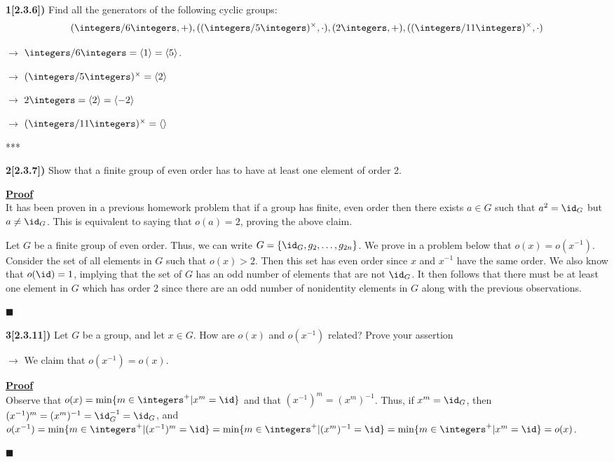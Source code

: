 \documentclass[12pt,a4paper]{article}
\newcommand{\prob}[2]{\textbf{#1)} #2}
\newenvironment{proof}
{
\textbf{\underline{Proof}} \\
}
{
\begin{flushright}
$\blacksquare$
\end{flushright}}
\begin{document}
\prob{1[2.3.6]}{Find all the generators of the following cyclic groups: 
\begin{align*}
(\integers/6\integers,+),((\integers/5\integers)^{\times},\cdot),(2\integers,+),((\integers/11\integers)^{\times},\cdot)
\end{align*}
}
$\rightarrow$ $\integers/6\integers = \langle 1 \rangle = \langle 5 \rangle$.

$\rightarrow$ $(\integers/5\integers)^{\times} = \langle 2 \rangle$

$\rightarrow$ $2\integers = \langle 2 \rangle = \langle -2 \rangle$

$\rightarrow$ $(\integers/11\integers)^{\times} = \langle \rangle$

***

\prob{2[2.3.7]}{Show that a finite group of even order has to have at least one element of order 2.}

\begin{proof}
It has been proven in a previous homework problem that if a group has finite, even order then there exists $a \in G$ such that $a^2 = \id_G$ but $a \not= \id_G$. This is equivalent to saying that $o(a) = 2$, proving the above claim.

Let $G$ be a finite group of even order. Thus, we can write $G = \{\id_{G},g_2,\hdots,g_{2n}\}$. We prove in a problem below that $o(x) = o(x^{-1})$. Consider the set of all elements in $G$ such that $o(x) > 2$. Then this set has even order since $x$ and $x^{-1}$ have the same order. We also know that $o(\id) = 1$, implying that the set of $G$ has an odd number of elements that are not $\id_G$. It then follows that there must be at least one element in $G$ which has order 2 since there are an odd number of nonidentity elements in $G$ along with the previous observations.
\end{proof}

\prob{3[2.3.11]}{Let $G$ be a group, and let $x \in G$. How are $o(x)$ and $o(x^{-1})$ related? Prove your assertion}

$\rightarrow$ We claim that $o(x^{-1}) = o(x)$.

\begin{proof}
Observe that $o(x) = \min\{m\in\integers^{+}|x^{m}=\id\}$ and that $(x^{-1})^m = (x^{m})^{-1}$. Thus, if $x^m = \id_G$, then $(x^{-1})^{m} = (x^{m})^{-1} = \id_G^{-1} = \id_{G}$, and $o(x^{-1}) = \min\{m\in\integers^{+}|(x^{-1})^{m}=\id\} = \min\{m\in\integers^{+}|(x^{m})^{-1}=\id\} = \min\{m\in\integers^{+}|x^{m}=\id\} =  o(x)$.
\end{proof}
\end{document}
